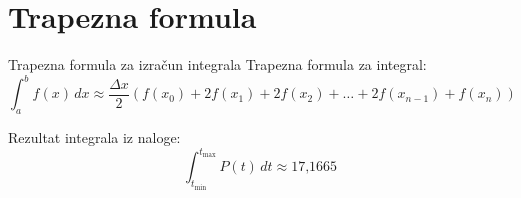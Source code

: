 \documentclass{beamer}
\begin{document}
\section{Trapezna formula}
\begin{frame}{Trapezna formula za izračun integrala}
    Trapezna formula za integral:
    \[
    \int_a^b f(x) \, dx \approx \frac{\Delta x}{2} \left( f(x_0) + 2f(x_1) + 2f(x_2) + \dots + 2f(x_{n-1}) + f(x_n) \right)
    \]
    
    Rezultat integrala iz naloge:
    \[
    \int_{t_{\text{min}}}^{t_{\text{max}}} P(t) \, dt \approx \text{17,1665}
    \]
\end{frame}
\end{document}
